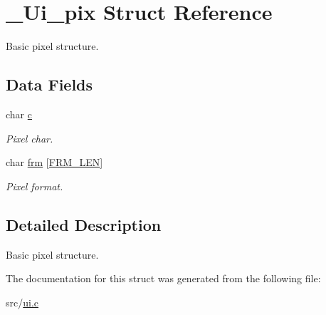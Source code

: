 \hypertarget{struct__Ui__pix}{}\section{\+\_\+\+Ui\+\_\+pix Struct Reference}
\label{struct__Ui__pix}


Basic pixel structure.  


\subsection*{Data Fields}
\begin{DoxyCompactItemize}
\item 
\mbox{\label{struct__Ui__pix_aa12b962b28524e2f295d0fd90b9595a8}} 
char \hyperlink{struct__Ui__pix_aa12b962b28524e2f295d0fd90b9595a8}{c}
\begin{DoxyCompactList}\small\item\em Pixel char. \end{DoxyCompactList}\item 
\mbox{\label{struct__Ui__pix_a0e503eb95fbe667b3c97e39dbad54649}} 
char \hyperlink{struct__Ui__pix_a0e503eb95fbe667b3c97e39dbad54649}{frm} \mbox{[}\hyperlink{ui_8c_a06eb930d834d042bf22819174e0158a6}{F\+R\+M\+\_\+\+L\+EN}\mbox{]}
\begin{DoxyCompactList}\small\item\em Pixel format. \end{DoxyCompactList}\end{DoxyCompactItemize}


\subsection{Detailed Description}
Basic pixel structure. 

The documentation for this struct was generated from the following file\+:\begin{DoxyCompactItemize}
\item 
src/\hyperlink{ui_8c}{ui.\+c}\end{DoxyCompactItemize}
